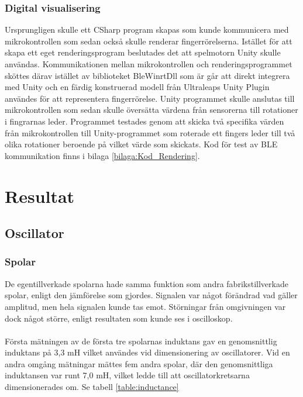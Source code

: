 \documentclass[a4paper]{article}
\begin{document}
\begin{sloppypar}
  \subsubsection{Digital visualisering}
  Ursprungligen skulle ett CSharp program skapas som kunde kommunicera med mikrokontrollen som sedan också skulle renderar fingerrörelserna.
  Istället för att skapa ett eget renderingsprogram beslutades det att spelmotorn Unity skulle användas.
  Kommunikationen mellan mikrokontrollen och renderingsprogrammet sköttes därav istället av biblioteket BleWinrtDll som är går att direkt integrera med Unity
  och en färdig konstruerad modell från Ultraleaps Unity Plugin användes för att representera fingerrörelse.
  Unity programmet skulle anslutas till mikrokontrollen som sedan skulle översätta värdena från sensorerna till rotationer i fingrarnas leder.
  Programmet testades genom att skicka två specifika värden från mikrokontrollen till Unity-programmet som roterade ett fingers leder till två olika rotationer beroende på vilket värde som skickats.
  Kod för test av BLE kommunikation finns i bilaga \ref{bilaga:Kod_Rendering}.



  \section{Resultat}

  \subsection{Oscillator}
  \subsubsection{Spolar}
  De egentillverkade spolarna hade samma funktion som andra fabrikstillverkade spolar, enligt den jämförelse som gjordes.
  Signalen var något förändrad vad gäller amplitud, men hela signalen kunde tas emot.
  Störningar från omgivningen var dock något större, enligt resultaten som kunde ses i oscilloskop.\\\\
  Första mätningen av de första tre spolarnas induktans gav en genomsnittlig induktans på 3,3 mH vilket användes vid dimensionering av oscillatorer.
  Vid en andra omgång mätningar mättes fem andra spolar, där den genomsnittliga induktansen var runt 7,0 mH, vilket ledde till att oscillatorkretsarna dimensionerades om. Se tabell \ref{table:inductance}


\end{sloppypar}
\end{document}
